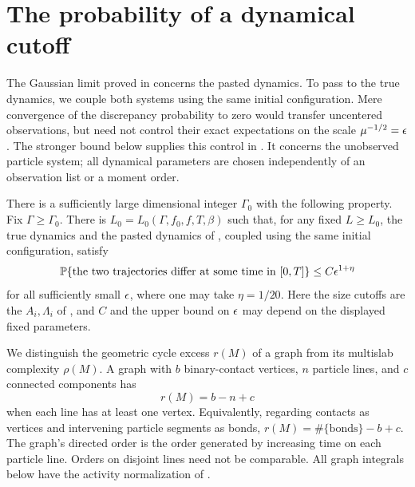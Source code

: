 \section{The probability of a dynamical cutoff}
\label{sec:cutoff}

The Gaussian limit proved in  concerns the
pasted dynamics. To pass to the true dynamics, we couple both systems
using the same initial configuration. Mere convergence of the
discrepancy probability to zero would transfer uncentered observations,
but need not control their exact expectations on the scale
\(\mu^{-1/2}=\epsilon\). The stronger bound below supplies this control
in . It concerns the unobserved particle
system; all dynamical parameters are chosen independently of an
observation list or a moment order.

\begin{proposition}\label{prop:cutoff}
There is a sufficiently large dimensional integer \(\Gamma_0\) with the
following property.  Fix \(\Gamma\geq\Gamma_0\).  There is
\(L_0=L_0(\Gamma,f_0,f,T,\beta)\) such that, for any fixed \(L\geq L_0\),
the true dynamics and the pasted dynamics of
, coupled using the same initial configuration,
satisfy
\begin{equation}\label{eq:cutoff-probability}
 \mathbb P\{\text{the two trajectories differ at some time in }[0,T]\}
 \leq C\epsilon^{1+\eta}
\end{equation}
for all sufficiently small \(\epsilon\), where one may take
\(\eta=1/20\).  Here the size cutoffs are the \(A_i,\Lambda_i\) of
, and \(C\) and the upper bound on \(\epsilon\) may
depend on the displayed fixed parameters.
\end{proposition}

We distinguish the geometric cycle excess \(r(M)\) of a graph from its
multislab complexity \(\rho(M)\).  A graph with \(b\) binary-contact
vertices, \(n\) particle lines, and \(c\) connected components has
\begin{equation}\label{eq:cutoff-euler}
 r(M)=b-n+c
\end{equation}
when each line has at least one vertex.  Equivalently, regarding contacts
as vertices and intervening particle segments as bonds,
\(r(M)=\#\{\text{bonds}\}-b+c\).
The graph's directed order is the order generated by increasing time on
each particle line.  Orders on disjoint lines need not be comparable.
All graph integrals below have the activity normalization of
.

